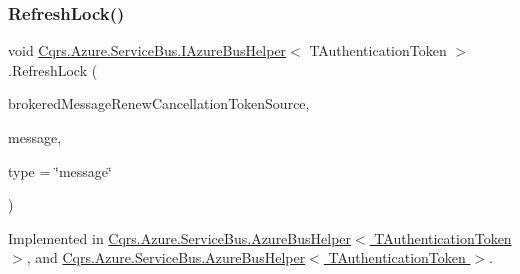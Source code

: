 \mbox{\label{interfaceCqrs_1_1Azure_1_1ServiceBus_1_1IAzureBusHelper_a51988703dad9dc41c834e620e4e6e31a}} 
\subsubsection{\texorpdfstring{Refresh\+Lock()}{RefreshLock()}}
{\footnotesize\ttfamily void \hyperlink{interfaceCqrs_1_1Azure_1_1ServiceBus_1_1IAzureBusHelper}{Cqrs.\+Azure.\+Service\+Bus.\+I\+Azure\+Bus\+Helper}$<$ T\+Authentication\+Token $>$.Refresh\+Lock (\begin{DoxyParamCaption}\item[{Cancellation\+Token\+Source}]{brokered\+Message\+Renew\+Cancellation\+Token\+Source,  }\item[{Brokered\+Message}]{message,  }\item[{string}]{type = {\ttfamily \char`\"{}message\char`\"{}} }\end{DoxyParamCaption})}



Implemented in \hyperlink{classCqrs_1_1Azure_1_1ServiceBus_1_1AzureBusHelper_aa4ef095148aae1af508fcd7b51f538d3}{Cqrs.\+Azure.\+Service\+Bus.\+Azure\+Bus\+Helper$<$ T\+Authentication\+Token $>$}, and \hyperlink{classCqrs_1_1Azure_1_1ServiceBus_1_1AzureBusHelper_aa4ef095148aae1af508fcd7b51f538d3}{Cqrs.\+Azure.\+Service\+Bus.\+Azure\+Bus\+Helper$<$ T\+Authentication\+Token $>$}.

\mbox{\label{interfaceCqrs_1_1Azure_1_1ServiceBus_1_1IAzureBusHelper_a1fe0ff74b4e5cce3d0b5a81dbaa273e0}} 
